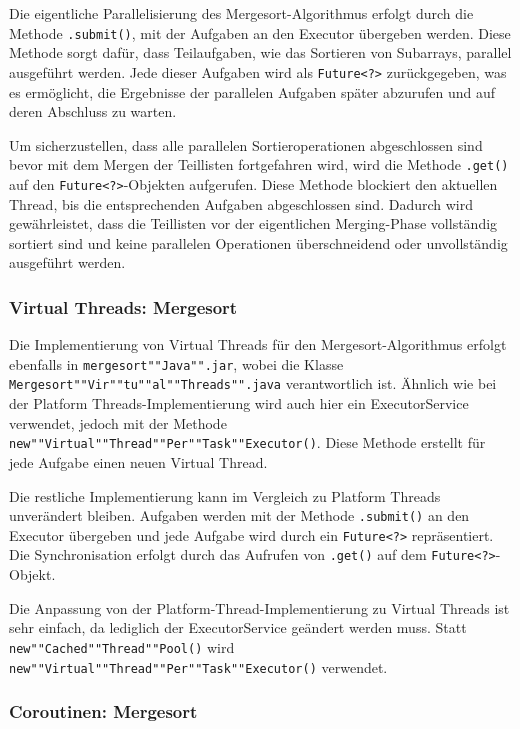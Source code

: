 \documentclass[fontsize=12pt,paper=a4,twoside=semi,parskip=half-,headsepline,headinclude]{scrreprt}
\begin{document}
Die eigentliche Parallelisierung des Mergesort-Algorithmus erfolgt durch die Methode \texttt{.submit()}, mit der Aufgaben an den Executor übergeben werden. Diese Methode sorgt dafür, dass Teilaufgaben, wie das Sortieren von Subarrays, parallel ausgeführt werden. Jede dieser Aufgaben wird als \texttt{Future<?>} zurückgegeben, was es ermöglicht, die Ergebnisse der parallelen Aufgaben später abzurufen und auf deren Abschluss zu warten.

Um sicherzustellen, dass alle parallelen Sortieroperationen abgeschlossen sind bevor mit dem Mergen der Teillisten fortgefahren wird, wird die Methode \texttt{.get()} auf den \texttt{Future<?>}-Objekten aufgerufen. Diese Methode blockiert den aktuellen Thread, bis die entsprechenden Aufgaben abgeschlossen sind. Dadurch wird gewährleistet, dass die Teillisten vor der eigentlichen Merging-Phase vollständig sortiert sind und keine parallelen Operationen überschneidend oder unvollständig ausgeführt werden.

\subsubsection{Virtual Threads: Mergesort}

Die Implementierung von Virtual Threads für den Mergesort-Algorithmus erfolgt ebenfalls in \texttt{mergesort""Java"".jar}, wobei die Klasse \texttt{Mergesort""Vir""tu""al""Threads"".java} verantwortlich ist. Ähnlich wie bei der Platform Threads-Implementierung wird auch hier ein ExecutorService verwendet, jedoch mit der Methode \texttt{new""Virtual""Thread""Per""Task""Executor()}. Diese Methode erstellt für jede Aufgabe einen neuen Virtual Thread.

Die restliche Implementierung kann im Vergleich zu Platform Threads unverändert bleiben. Aufgaben werden mit der Methode \texttt{.submit()} an den Executor übergeben und jede Aufgabe wird durch ein \texttt{Future<?>} repräsentiert. Die Synchronisation erfolgt durch das Aufrufen von \texttt{.get()} auf dem \texttt{Future<?>}-Objekt.

Die Anpassung von der Platform-Thread-Implementierung zu Virtual Threads ist sehr einfach, da lediglich der ExecutorService geändert werden muss. Statt \texttt{new""Cached""Thread""Pool()} wird \texttt{new""Virtual""Thread""Per""Task""Executor()} verwendet.

\subsubsection{Coroutinen: Mergesort}
\end{document}
